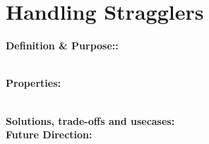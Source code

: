 \section{Handling Stragglers}


\noindent\textbf{Definition \& Purpose::} 


\noindent \textbf{\\Properties:}

\noindent \textbf{\\Solutions, trade-offs and usecases:}
\noindent \textbf{\\Future Direction:}  

%			



